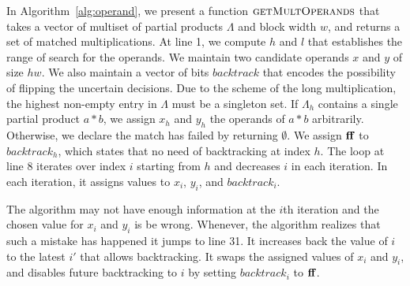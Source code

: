 In Algorithm~\ref{alg:operand}, we present a function
$\textsc{getMultOperands}$ that takes a vector of multiset of partial
products $\Lambda$ and block width $w$, and returns a set of matched
multiplications.
%
At line 1, we compute $h$ and $l$ that establishes the range of search for
the operands.
%
We maintain two candidate operands $x$ and $y$ of size $hw$.
%
We also maintain a vector of bits $backtrack$ that encodes 
the possibility of flipping the uncertain decisions.
%
Due to the scheme of the long multiplication, the highest
non-empty entry in $\Lambda$ must be a singleton set.
%
If $\Lambda_h$ contains a single partial product $a*b$,
we assign $x_h$ and $y_h$ the operands of $a*b$ arbitrarily.
%
Otherwise, we declare the match has failed by returning $\emptyset$.
%
We assign $\mathbf{ff}$ to $backtrack_h$, which states that
no need of backtracking at index $h$.
%
The loop at line 8 iterates over index $i$ starting from $h$ and decreases
$i$ in each iteration.
%
In each iteration, it assigns values to $x_i$, $y_i$, and $backtrack_i$. 
%

The algorithm may not have enough information at the $i$th iteration
and the chosen value for $x_i$ and $y_i$ is be wrong.
%
Whenever, the algorithm realizes that such a mistake has happened
it jumps to line 31.
%
It increases back the value of $i$ to the latest $i'$ that allows
backtracking.
%
It swaps the assigned values of $x_i$ and $y_i$, and disables future
backtracking to $i$ by setting $backtrack_i$ to
$\mathbf{ff}$.
%

